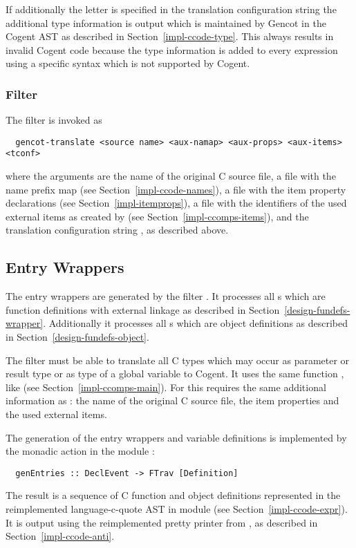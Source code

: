 If additionally the letter  is specified in the translation configuration string the additional type information
is output which is maintained by Gencot in the Cogent AST as described in Section~\ref{impl-ccode-type}. This always
results in invalid Cogent code because the type information is added to every expression using a specific syntax which
is not supported by Cogent.

\subsubsection{Filter }

The filter  is invoked as
\begin{verbatim}
  gencot-translate <source name> <aux-namap> <aux-props> <aux-items> <tconf>
\end{verbatim}
where the arguments are the name of the original C source file, a file  with the name prefix map 
(see Section~\ref{impl-ccode-names}), a file  with the item property declarations (see 
Section~\ref{impl-itemprops}), a file  with the identifiers of the used external items as created
by  (see Section~\ref{impl-ccomps-items}), and the translation configuration string ,
as described above.

\subsection{Entry Wrappers}
\label{impl-ccomps-entries}

The entry wrappers are generated by the filter . It processes all s
which are function definitions with external linkage as described in Section~\ref{design-fundefs-wrapper}.
Additionally it processes all s which are object definitions as described in 
Section~\ref{design-fundefs-object}.

The filter must be able to translate all C types which may occur as parameter or result type or as type 
of a global variable to Cogent. It
uses the same function , like  (see Section~\ref{impl-ccomps-main}).
For this  requires the same additional information as : the 
name of the original C source file, the item properties and the used external items.

The generation of the entry wrappers and variable definitions is implemented by the monadic action 
 in the module :
\begin{verbatim}
  genEntries :: DeclEvent -> FTrav [Definition]
\end{verbatim}
The result is a sequence of C function and object definitions represented in the reimplemented language-c-quote AST
in module  (see Section~\ref{impl-ccode-expr}). It is output using the reimplemented 
pretty printer from , as described in Section~\ref{impl-ccode-anti}.

